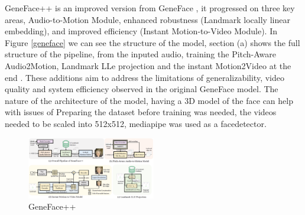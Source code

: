 \documentclass[12pt]{article}
\begin{document}
GeneFace++ is an improved version from GeneFace \cite{geneface} \cite{ye2023geneface++}, it progressed on three key areas, Audio-to-Motion Module, enhanced robustness (Landmark locally linear embedding), and improved efficiency (Instant Motion-to-Video Module). In Figure \ref{geneface} we can see the structure of the model, section (a) shows the full structure of the pipeline, from the inputed audio, training the Pitch-Aware Audio2Motion, Landmark LLe projection and the instant Motion2Video at the end \cite{ye2023geneface++}. These additions aim to address the limitations of generalizability, video quality and system efficiency observed in the original GeneFace model. The nature of the architecture of the model, having a 3D model of the face can help with issues of Preparing the dataset before training was needed, the videos needed to be scaled into 512x512, mediapipe \cite{GoogleFaceDetector} was used as a facedetector.

\begin{figure}[h!]
    \centering
    \includegraphics[width=0.5\textwidth]{images/geneface++.png}
    \caption{GeneFace++}
    \label{img:geneface}
\end{figure}
\end{document}
